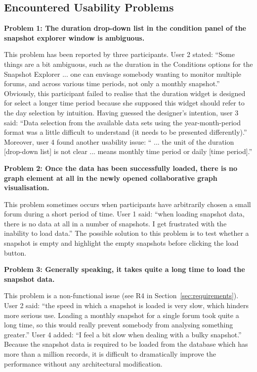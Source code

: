 \subsection{Encountered Usability Problems}
\textbf{Problem 1: The duration drop-down list in the condition panel of the snapshot explorer window is ambiguous.}

This problem has been reported by three participants. User 2 stated: ``Some things are a bit ambiguous, such as the duration in the Conditions options for the Snapshot Explorer ... one can envisage somebody wanting to monitor multiple forums, and across various time periods, not only a monthly snapshot.'' Obviously, this participant failed to realise that the duration widget is designed for select a longer time period because she supposed this widget should refer to the day selection by intuition. Having guessed the designer's intention, user 3 said: ``Data selection from the available data sets using the year-month-period format was a little difficult to understand (it needs to be presented differently).'' Moreover, user 4 found another usability issue: `` ... the unit of the duration [drop-down list] is not clear ... means monthly time period or daily [time period].''

\textbf{Problem 2: Once the data has been successfully loaded, there is no graph element at all in the newly opened collaborative graph visualisation.}

This problem sometimes occurs when participants have arbitrarily chosen a small forum during a short period of time. User 1 said: ``when loading snapshot data, there is no data at all in a number of snapshots. I get frustrated with the inability to load data.'' The possible solution to this problem is to test whether a snapshot is empty and highlight the empty snapshots before clicking the load button.

\textbf{Problem 3: Generally speaking, it takes quite a long time to load the snapshot data.}

This problem is a non-functional issue (see R4 in Section~\ref{sec:requirements}). User 2 said: ``the speed in which a snapshot is loaded is very slow, which hinders more serious use. Loading a monthly snapshot for a single forum took quite a long time, so this would really prevent somebody from analysing something greater.'' User 4 added: ``I feel a bit slow when dealing with a bulky snapshot.'' Because the snapshot data is required to be loaded from the database which has more than a million records, it is difficult to dramatically improve the performance without any architectural modification.

